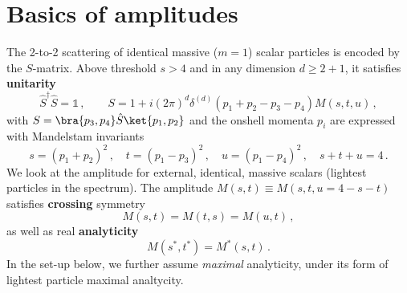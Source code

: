 

\section*{Basics of amplitudes}

The 2-to-2 scattering of identical massive ($m=1$) scalar particles is encoded by the $S$-matrix. Above threshold $s > 4$ and in any dimension $d\geq2+1$, it satisfies \textbf{unitarity}
\begin{equation}
\hat S^\dagger \hat  S=\mathbb{1}\,, \qquad
S=1+i (2\pi)^d \delta^{(d)}(p_1+p_2-p_3-p_4) M(s,t,u)\,,
\label{eq:unitarity} 
\end{equation}
with $S=\bra{p_3,p_4} \hat{S} \ket{p_1, p_2}$ and the onshell momenta $p_i$ are expressed with Mandelstam invariants
\begin{equation}
s=(p_1+p_2)^2\,,\quad
t=(p_1-p_3)^2\,,\quad
u=(p_1-p_4)^2\,,\quad
s+t+u=4\,.
\end{equation}
We look at the amplitude for external, identical, massive scalars (lightest particles in the spectrum). The amplitude $M(s,t)\equiv M(s,t,u=4-s-t)$ satisfies \textbf{crossing} symmetry
\begin{equation}
M(s,t)=M(t,s)=M(u,t)\,,
\end{equation}
as well as real \textbf{analyticity} 
\begin{equation}
M(s^*,t^*)=M^*(s,t)\,.
\end{equation}
In the set-up below, we further assume {\it maximal} analyticity, under its form of lightest particle maximal analtycity.




